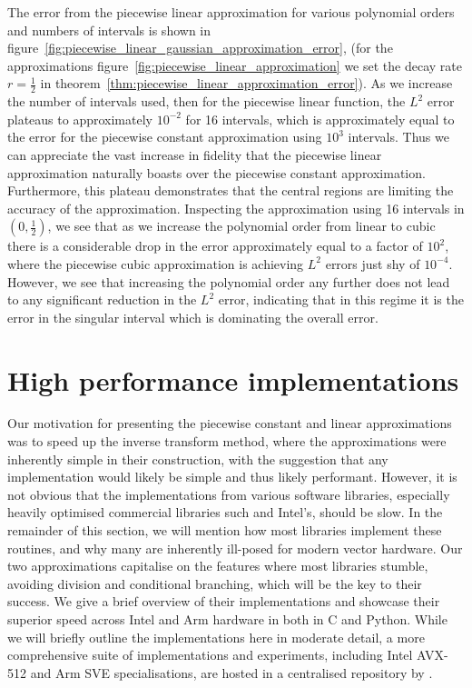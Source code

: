 \documentclass[manuscript,review]{acmart}
\begin{document}
The error from the piecewise linear approximation for various polynomial orders and numbers of intervals is shown in figure~\ref{fig:piecewise_linear_gaussian_approximation_error}, (for the approximations figure~\ref{fig:piecewise_linear_approximation} we set the decay rate $ r = \tfrac{1}{2} $ in theorem~\ref{thm:piecewise_linear_approximation_error}). As we increase the number of intervals used, then for the piecewise linear function, the $ L^2 $ error plateaus to approximately $ 10^{-2} $ for 16 intervals, which is approximately equal to the error for the piecewise constant approximation using $ 10^3 $ intervals. Thus we can appreciate the vast increase in fidelity that the piecewise linear approximation naturally boasts over the piecewise constant approximation. Furthermore, this plateau demonstrates that the central regions are limiting the accuracy of the approximation. Inspecting the approximation using 16 intervals in $ (0, \tfrac{1}{2}) $, we see that as we increase the polynomial order from linear to cubic there is a considerable drop in the error approximately equal to a factor of $ 10^2 $, where the piecewise cubic approximation is achieving $ L^2 $ errors just shy of $ 10^{-4} $. However, we see that increasing the polynomial order any further does not lead to any significant reduction in the $ L^2 $ error, indicating that in this regime it is the error in the singular interval which is dominating the overall error. 

\section{High performance implementations}
\label{sec:high_performance_impementations}

Our motivation for presenting the piecewise constant and linear approximations was to speed up the inverse transform method, where the approximations were inherently simple in their construction, with the suggestion that any implementation would likely be simple and thus likely performant. However, it is not obvious that the implementations from various software libraries, especially heavily optimised commercial libraries such and Intel's, should be slow. In the remainder of this section, we will mention how most libraries implement these routines, and why many are inherently ill-posed for modern vector hardware. Our two approximations capitalise on the features where most libraries stumble, avoiding division and conditional branching, which will be the key to their success. We give a brief overview of their implementations and showcase their superior speed across Intel and Arm hardware in both in C and Python. While we will briefly outline the implementations here in moderate detail, a more comprehensive suite of implementations and experiments, including Intel AVX-512 and Arm SVE specialisations, are hosted in a centralised repository by \citet{sheridan2020approximate_random}.
\end{document}
